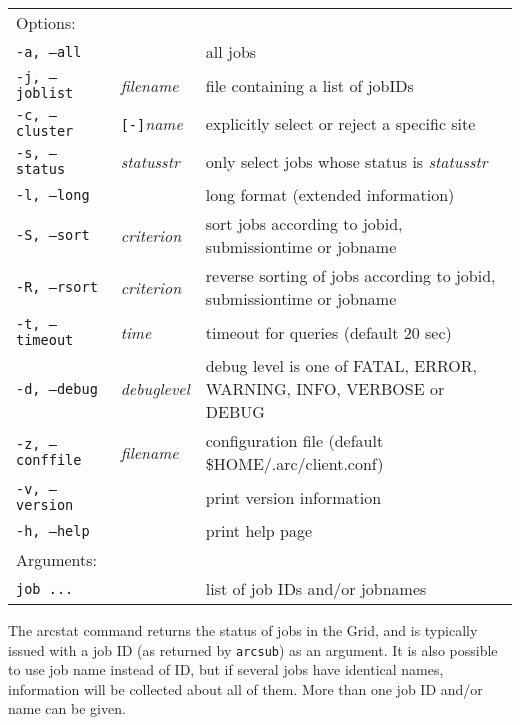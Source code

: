 \begin{shaded}
\end{shaded}
\begin{longtable}{llp{8cm}}
   Options:&&\\
   \texttt{-a, --all}& & all jobs\\
   \texttt{-j, --joblist}& \textit{filename}& file containing a list of jobIDs\\
   \texttt{-c, --cluster}&\verb#[-]#\textit{name}&explicitly select or reject a specific site\\
   \texttt{-s, --status}& \textit{statusstr} &only select jobs whose status is \textit{statusstr}\\
   \texttt{-l, --long}& & long format (extended information)\\
   \texttt{-S, --sort}& \textit{criterion} & sort jobs according to jobid, submissiontime or jobname\\
   \texttt{-R, --rsort}& \textit{criterion} & reverse sorting of jobs according to jobid, submissiontime or jobname\\

   \texttt{-t, --timeout}& \textit{time}& timeout for queries (default 20 sec)\\
   \texttt{-d, --debug}& \textit{debuglevel}&debug level is one of  FATAL, ERROR, WARNING, INFO, VERBOSE or DEBUG\\
   \texttt{-z, --conffile}&\textit{filename}& configuration file (default {\$}HOME/.arc/client.conf)\\
   \texttt{-v, --version}& & print version information\\
   \texttt{-h, --help}& & print help page\\
   Arguments:&&\\
   \texttt{job ...} && list of job IDs and/or jobnames\\
\end{longtable}

The arcstat command returns the status of jobs in the Grid, and is typically issued with a
job ID (as returned by \verb#arcsub#) as an argument. It is also possible to use job name instead of
ID, but if several jobs have identical names, information will be collected about all of them.
More than one job ID and/or name can be given.

